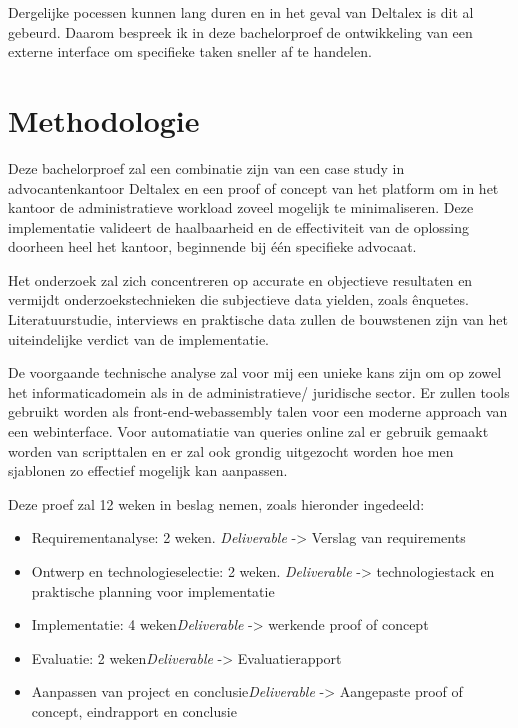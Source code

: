 Dergelijke pocessen kunnen lang duren en in het geval van Deltalex is dit al gebeurd. Daarom bespreek ik in deze bachelorproef de ontwikkeling van een externe interface om specifieke taken sneller af te handelen.


\section{Methodologie}%
\label{sec:methodologie}
Deze bachelorproef zal een combinatie zijn van een case study in advocantenkantoor Deltalex en een proof of concept van het platform om in het kantoor de administratieve workload zoveel mogelijk te minimaliseren. Deze implementatie valideert de haalbaarheid en de effectiviteit van de oplossing doorheen heel het kantoor, beginnende bij één specifieke advocaat. 

Het onderzoek zal zich concentreren op accurate en objectieve resultaten en vermijdt onderzoekstechnieken die subjectieve data yielden, zoals ênquetes. Literatuurstudie, interviews en praktische data zullen de bouwstenen zijn van het uiteindelijke verdict van de implementatie. 

De voorgaande technische analyse zal voor mij een unieke kans zijn om op zowel het informaticadomein als in de administratieve/ juridische sector. Er zullen tools gebruikt worden als front-end-webassembly talen voor een moderne approach van een webinterface. Voor automatiatie van queries online zal er gebruik gemaakt worden van scripttalen en er zal ook grondig uitgezocht worden hoe men sjablonen zo effectief mogelijk kan aanpassen. 

Deze proef zal 12 weken in beslag nemen, zoals hieronder ingedeeld:
\begin{itemize}
        \item Requirementanalyse: 2 weken. \emph{Deliverable} -> Verslag van requirements
        \item Ontwerp en technologieselectie: 2 weken. \emph{Deliverable} -> technologiestack en praktische planning voor implementatie
        \item Implementatie: 4 weken\emph{Deliverable} -> werkende proof of concept
        \item Evaluatie: 2 weken\emph{Deliverable} -> Evaluatierapport
        \item Aanpassen van project en conclusie\emph{Deliverable} -> Aangepaste proof of concept, eindrapport en conclusie
\end{itemize}

